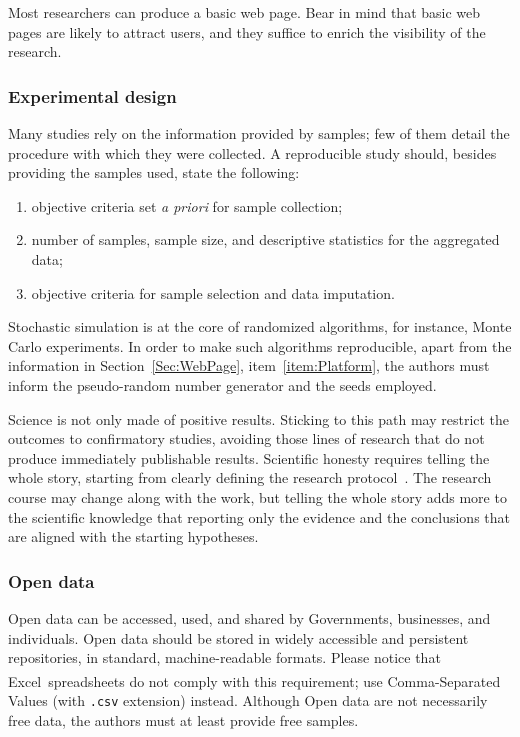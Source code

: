 \documentclass[journal,twoside]{IEEEtran}
\begin{document}
Most researchers can produce a basic web page. 
Bear in mind that basic web pages are likely to attract users, and they suffice to enrich the visibility of the research.

\subsubsection{Experimental design} Many studies rely on the information provided by samples;
few of them detail the procedure with which they were collected.
A reproducible study should, besides providing the samples used, state the following:
\begin{enumerate}
	\item objective criteria set \textit{a priori} for sample collection;
	\item number of samples, sample size, and descriptive statistics for the aggregated data;
	\item objective criteria for sample selection and data imputation.
\end{enumerate}

Stochastic simulation is at the core of randomized algorithms, for instance, Monte Carlo experiments.
In order to make such algorithms reproducible, apart from the information in Section~\ref{Sec:WebPage}, item~\ref{item:Platform}, the authors must inform the pseudo-random number generator and the seeds employed.

Science is not only made of positive results.
Sticking to this path may restrict the outcomes to confirmatory studies, avoiding those lines of research that do not produce immediately publishable results.
Scientific honesty requires telling the whole story, starting from clearly defining the research protocol~\cite{TellItlikeItIs}.
The research course may change along with the work, but telling the whole story adds more to the scientific knowledge that reporting only the evidence and the conclusions that are aligned with the starting hypotheses.


\subsubsection{Open data} Open data can be accessed, used, and shared by Governments, businesses, and individuals. 
Open data should be stored in widely accessible and persistent repositories, in standard, machine-readable formats.
Please notice that Excel\textsuperscript{\textcopyright}\ spreadsheets do not comply with this requirement; use Comma-Separated Values (with \verb|.csv| extension) instead.
Although Open data are not necessarily free data, the authors must at least provide free samples.
\end{document}
